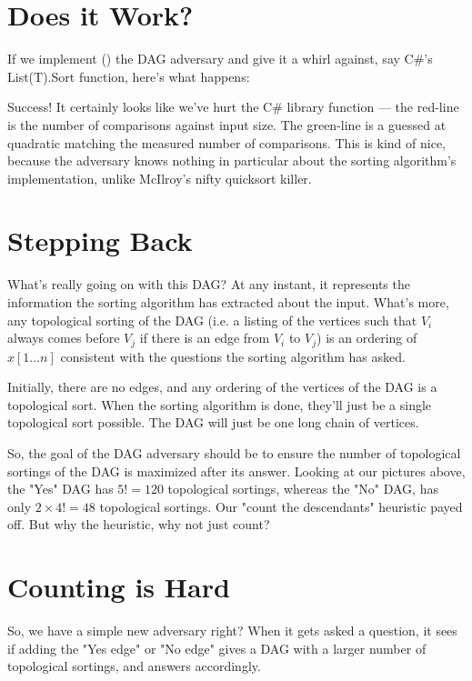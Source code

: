 \documentclass[11pt]{article}
\begin{document}
\section{Does it Work?}

If we implement (\texttt{}) the DAG adversary and give it a whirl against, say C\#'s List(T).Sort function, here's what happens:

Success! It certainly looks like we've hurt the C\# library function --- the red-line is the number of comparisons against input size.  The green-line is a guessed at quadratic matching the measured number of comparisons. This is kind of nice, because the adversary knows nothing in particular about the sorting algorithm's implementation, unlike McIlroy's nifty quicksort killer.
\section{Stepping Back}

What's really going on with this DAG? At any instant, it represents the information the sorting algorithm has extracted about the input. What's more, any topological sorting of the DAG (i.e. a listing of the vertices such that $V_i$ always comes before $V_j$ if there is an edge from $V_i$ to $V_j$) is an ordering of $x[1\ldots n]$ consistent with the questions the sorting algorithm has asked.

Initially, there are no edges, and any ordering of the vertices of the DAG is a topological sort. When the sorting algorithm is done, they'll just be a single topological sort possible. The DAG will just be one long chain of vertices.

So, the goal of the DAG adversary should be to ensure the number of topological sortings of the DAG is maximized after its answer. Looking at our pictures above, the "Yes" DAG has $5! = 120$ topological sortings, whereas the "No" DAG, has only $2 \times 4! = 48$ topological sortings. Our "count the descendants" heuristic payed off. But why the heuristic, why not just count?
\section{Counting is Hard}

So, we have a simple new adversary right? When it gets asked a question, it sees if adding the "Yes edge" or "No edge" gives a DAG with a larger number of topological sortings, and answers accordingly.
\end{document}

